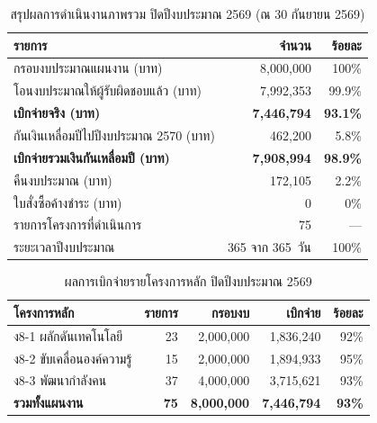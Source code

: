 \begin{table}[H]
\centering
\caption{สรุปผลการดำเนินงานภาพรวม ปิดปีงบประมาณ 2569 (ณ 30 กันยายน 2569)}
\small
\begin{tabular}{L{7.2cm}rr}
\toprule
{}
\textbf{รายการ} & \textbf{จำนวน} & \textbf{ร้อยละ}\\
\midrule
กรอบงบประมาณแผนงาน (บาท) & 8,000,000 & 100\%\\
โอนงบประมาณให้ผู้รับผิดชอบแล้ว (บาท) & 7,992,353 & 99.9\%\\
\textbf{เบิกจ่ายจริง (บาท)} & \textbf{7,446,794} & \textbf{93.1\%}\\
กันเงินเหลื่อมปีไปปีงบประมาณ 2570 (บาท) & 462,200 & 5.8\%\\
\textbf{เบิกจ่ายรวมเงินกันเหลื่อมปี (บาท)} & \textbf{7,908,994} & \textbf{98.9\%}\\
คืนงบประมาณ (บาท) & 172,105 & 2.2\%\\
ใบสั่งซื้อค้างชำระ (บาท) & 0 & 0\%\\
\midrule
{}
รายการโครงการที่ดำเนินการ & 75 & ---\\
ระยะเวลาปีงบประมาณ & 365 จาก 365~วัน & 100\%\\
\bottomrule
\end{tabular}
\end{table}

\begin{table}[H]
\centering
\caption{ผลการเบิกจ่ายรายโครงการหลัก ปิดปีงบประมาณ 2569}
\small
\begin{tabular}{L{5.5cm}rrrr}
\toprule
{}
\textbf{โครงการหลัก} & \textbf{รายการ} & \textbf{กรอบงบ} & \textbf{เบิกจ่าย} & \textbf{ร้อยละ}\\
\midrule
ง8-1 ผลักดันเทคโนโลยี & 23 & 2,000,000 & 1,836,240 & 92\%\\
ง8-2 ขับเคลื่อนองค์ความรู้ & 15 & 2,000,000 & 1,894,933 & 95\%\\
ง8-3 พัฒนากำลังคน & 37 & 4,000,000 & 3,715,621 & 93\%\\
\midrule
{}
\textbf{รวมทั้งแผนงาน} & \textbf{75} & \textbf{8,000,000} & \textbf{7,446,794} & \textbf{93\%}\\
\bottomrule
\end{tabular}
\end{table}

